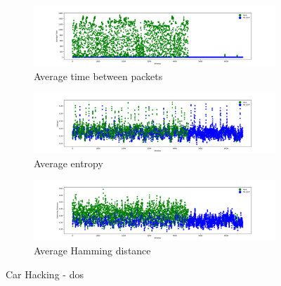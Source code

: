 \begin{figure}
    \centering
    \begin{subfigure}[b]{\linewidth}
        \includegraphics[width = \linewidth]{img/parts/app/tests/car_hacking/DoS/AvgTime.png}
        \caption{Average time between packets}
        \label{subfig:extract_carhacking_dos_avgtime}
    \end{subfigure}
    \begin{subfigure}[b]{\linewidth}
        \includegraphics[width = \linewidth]{img/parts/app/tests/car_hacking/DoS/Entropy.png}
        \caption{Average entropy}
        \label{subfig:extract_carhacking_dos_entropy}
    \end{subfigure}
    \begin{subfigure}[b]{\linewidth}
        \includegraphics[width = \linewidth]{img/parts/app/tests/car_hacking/DoS/HammingDist.png}
        \caption{Average Hamming distance}
        \label{subfig:extract_carhacking_dos_hammingdist}
    \end{subfigure}
    \caption{Car Hacking - \gls{dos}}
    \label{fig:extract_carhacking_dos}
\end{figure}

